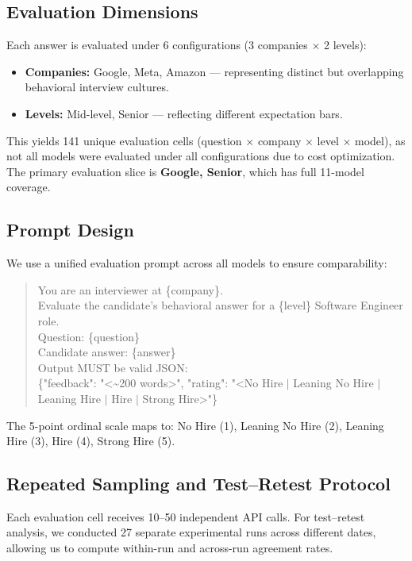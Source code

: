 \documentclass{article}
\begin{document}
\subsection{Evaluation Dimensions}
Each answer is evaluated under 6 configurations (3 companies $\times$ 2 levels):
\begin{itemize}
  \item \textbf{Companies:} Google, Meta, Amazon --- representing distinct but overlapping behavioral interview cultures.
  \item \textbf{Levels:} Mid-level, Senior --- reflecting different expectation bars.
\end{itemize}
This yields 141 unique evaluation cells (question $\times$ company $\times$ level $\times$ model), as not all models were evaluated under all configurations due to cost optimization. The primary evaluation slice is \textbf{Google, Senior}, which has full 11-model coverage.

\subsection{Prompt Design}
We use a unified evaluation prompt across all models to ensure comparability:

\begin{quote}
\small\ttfamily
You are an interviewer at \{company\}.\\
Evaluate the candidate's behavioral answer for a \{level\} Software Engineer role.\\[2pt]
Question: \{question\}\\
Candidate answer: \{answer\}\\[2pt]
Output MUST be valid JSON:\\
\{"feedback": "<\textasciitilde 200 words>", "rating": "<No Hire $|$ Leaning No Hire $|$\\
\phantom{\{}Leaning Hire $|$ Hire $|$ Strong Hire>"\}
\end{quote}

The 5-point ordinal scale maps to: No Hire (1), Leaning No Hire (2), Leaning Hire (3), Hire (4), Strong Hire (5).

\subsection{Repeated Sampling and Test--Retest Protocol}
Each evaluation cell receives 10--50 independent API calls. For test--retest analysis, we conducted 27 separate experimental runs across different dates, allowing us to compute within-run and across-run agreement rates.
\end{document}
